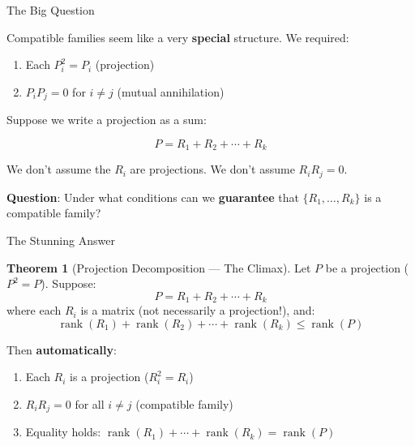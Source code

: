 \documentclass[10pt]{beamer}
\theoremstyle{definition}
\newtheorem{thm}{Theorem}[section]
\newcommand{\x}[1]{\alert{\textbf{#1}}}
\begin{document}
\begin{frame}{The Big Question}

Compatible families seem like a very \x{special} structure. We required:

\begin{enumerate}
\item Each $P_i^2 = P_i$ \quad (projection)
\item $P_i P_j = 0$ for $i \neq j$ \quad (mutual annihilation)
\end{enumerate}

\vspace{0.5em}

Suppose we write a projection as a sum:

$$P = R_1 + R_2 + \cdots + R_k$$

We don't assume the $R_i$ are projections. We don't assume $R_i R_j = 0$.

\vspace{0.5em}

\x{Question}: Under what conditions can we \x{guarantee} that $\{R_1, \ldots, R_k\}$ is a compatible family?

\end{frame}


\begin{frame}{The Stunning Answer}

\begin{thm}[Projection Decomposition --- The Climax]
Let $P$ be a projection ($P^2 = P$). Suppose:
$$P = R_1 + R_2 + \cdots + R_k$$
where each $R_i$ is a matrix (not necessarily a projection!), and:
$$\operatorname{rank}(R_1) + \operatorname{rank}(R_2) + \cdots + \operatorname{rank}(R_k) \leq \operatorname{rank}(P)$$

Then \x{automatically}:
\begin{enumerate}
\item Each $R_i$ is a projection ($R_i^2 = R_i$)
\item $R_i R_j = 0$ for all $i \neq j$ (compatible family)
\item Equality holds: $\operatorname{rank}(R_1) + \cdots + \operatorname{rank}(R_k) = \operatorname{rank}(P)$
\end{enumerate}
\end{thm}

\end{frame}
\end{document}
